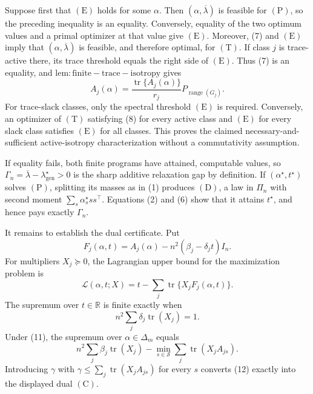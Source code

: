 Suppose first that \((\mathrm E)\) holds for some \(\alpha\).  Then \((\alpha,\overline\lambda)\) is feasible for \((\mathrm P)\), so the preceding inequality is an equality.  Conversely, equality of the two optimum values and a primal optimizer at that value give \((\mathrm E)\).  Moreover, (7) and \((\mathrm E)\) imply that \((\alpha,\overline\lambda)\) is feasible, and therefore optimal, for \((\mathrm T)\).  If class \(j\) is trace-active there, its trace threshold equals the right side of \((\mathrm E)\).  Thus (7) is an equality, and \(\mathrm{lem:finite-trace-isotropy}\) gives
\[
A_j(\alpha)
=\frac{\operatorname{tr}\{A_j(\alpha)\}}{r_j}
P_{\operatorname{range}(G_j)}. \tag{8}
\]
For trace-slack classes, only the spectral threshold \((\mathrm E)\) is required.  Conversely, an optimizer of \((\mathrm T)\) satisfying (8) for every active class and \((\mathrm E)\) for every slack class satisfies \((\mathrm E)\) for all classes.  This proves the claimed necessary-and-sufficient active-isotropy characterization without a commutativity assumption.

If equality fails, both finite programs have attained, computable values, so
\(\Gamma_n=\overline\lambda-\lambda_{\mathrm{gen}}^\star>0\) is the sharp additive relaxation gap by definition.  If \((\alpha^\star,t^\star)\) solves \((\mathrm P)\), splitting its masses as in (1) produces \((\mathrm D)\), a law in \(\Pi_n\) with second moment \(\sum_s\alpha_s^\star ss^\top\).  Equations (2) and (6) show that it attains \(t^\star\), and hence pays exactly \(\Gamma_n\).

It remains to establish the dual certificate.  Put
\[
F_j(\alpha,t)=A_j(\alpha)-n^2(\beta_j-\delta_jt)I_n. \tag{9}
\]
For multipliers \(X_j\succeq0\), the Lagrangian upper bound for the maximization problem is
\[
\mathcal L(\alpha,t;X)
=t-\sum_j\operatorname{tr}\{X_jF_j(\alpha,t)\}. \tag{10}
\]
The supremum over \(t\in\mathbb R\) is finite exactly when
\[
n^2\sum_j\delta_j\operatorname{tr}(X_j)=1. \tag{11}
\]
Under (11), the supremum over \(\alpha\in\Delta_m\) equals
\[
n^2\sum_j\beta_j\operatorname{tr}(X_j)
-\min_{s\in\mathscr S}\sum_j\operatorname{tr}(X_jA_{js}). \tag{12}
\]
Introducing \(\gamma\) with
\(\gamma\le\sum_j\operatorname{tr}(X_jA_{js})\) for every \(s\) converts (12) exactly into the displayed dual \((\mathrm C)\).

